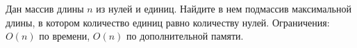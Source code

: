 \documentclass{article}
\begin{document}
Дан массив длины $n$ из нулей и единиц. Найдите в нем подмассив максимальной длины, в котором количество единиц равно количеству нулей. 
Ограничения: $O(n)$ по времени, $O(n)$ по дополнительной памяти.
\end{document}
